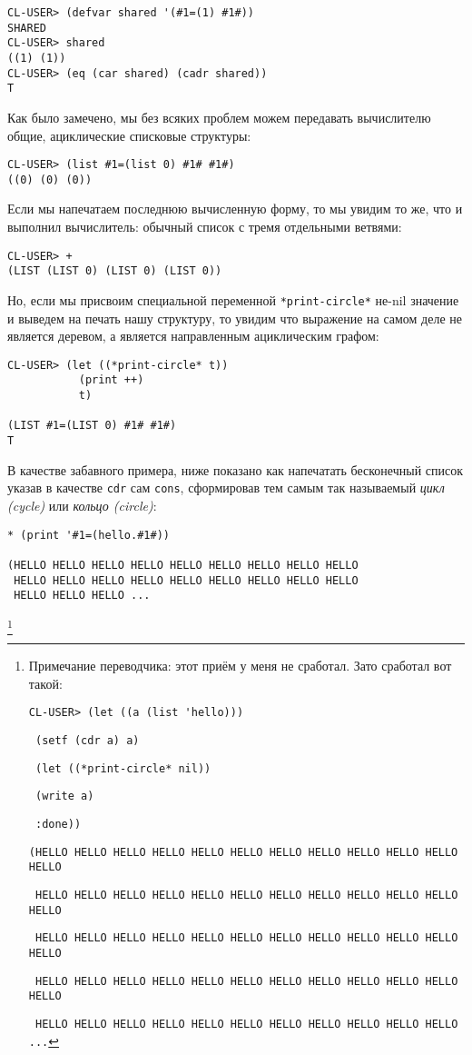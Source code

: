 \begin{verbatim}
CL-USER> (defvar shared '(#1=(1) #1#))
SHARED
CL-USER> shared
((1) (1))
CL-USER> (eq (car shared) (cadr shared))
T
\end{verbatim}

Как было замечено, мы без всяких проблем можем передавать вычислителю общие, ациклические списковые структуры:

\begin{verbatim}
CL-USER> (list #1=(list 0) #1# #1#)
((0) (0) (0))
\end{verbatim}

Если мы напечатаем последнюю вычисленную форму, то мы увидим то же, что и выполнил вычислитель: обычный список с тремя отдельными ветвями:

\begin{verbatim}
CL-USER> +
(LIST (LIST 0) (LIST 0) (LIST 0))
\end{verbatim}

Но, если мы присвоим специальной переменной \verb"*print-circle*" не-nil значение и выведем на печать нашу структуру, то увидим что выражение на самом деле не является деревом, а является направленным ациклическим графом:

\begin{verbatim}
CL-USER> (let ((*print-circle* t))
           (print ++)
           t)

(LIST #1=(LIST 0) #1# #1#) 
T
\end{verbatim}

В качестве забавного примера, ниже показано как напечатать бесконечный список указав в качестве \verb"cdr" сам \verb"cons", сформировав тем самым так называемый \emph{цикл (cycle)} или \emph{кольцо (circle)}:

\begin{verbatim}
* (print '#1=(hello.#1#))

(HELLO HELLO HELLO HELLO HELLO HELLO HELLO HELLO HELLO 
 HELLO HELLO HELLO HELLO HELLO HELLO HELLO HELLO HELLO 
 HELLO HELLO HELLO ...
\end{verbatim}
\footnote{Примечание переводчика: этот приём у меня не сработал. Зато сработал вот такой:

\texttt{\verb"CL-USER> (let ((a (list 'hello)))"}

\texttt{\qquad\qquad\quad\verb" (setf (cdr a) a)"}

\texttt{\qquad\qquad\quad\verb" (let ((*print-circle* nil))"}

\texttt{\qquad\qquad\qquad\verb" (write a)"}

\texttt{\qquad\qquad\qquad\verb" :done))"}

\verb"(HELLO HELLO HELLO HELLO HELLO HELLO HELLO HELLO HELLO HELLO HELLO HELLO"

\verb" HELLO HELLO HELLO HELLO HELLO HELLO HELLO HELLO HELLO HELLO HELLO HELLO"

\verb" HELLO HELLO HELLO HELLO HELLO HELLO HELLO HELLO HELLO HELLO HELLO HELLO"

\verb" HELLO HELLO HELLO HELLO HELLO HELLO HELLO HELLO HELLO HELLO HELLO HELLO"

\verb" HELLO HELLO HELLO HELLO HELLO HELLO HELLO HELLO HELLO HELLO HELLO ..."
}

